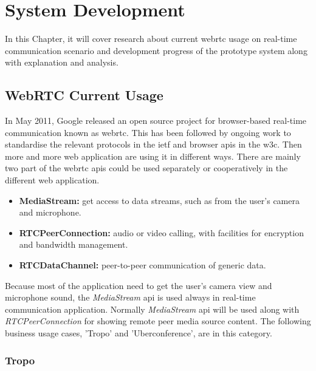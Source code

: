 \chapter{System Development}
\label{chp:sys_dev}

\noindent In this Chapter, it will cover research about current \gls{webrtc} usage on real-time communication scenario and development progress of the prototype system along with explanation and analysis.

\section{WebRTC Current Usage}

\noindent In May 2011, Google released an open source project for browser-based real-time communication known as \gls{webrtc}. This has been followed by ongoing work to standardise the relevant protocols in the \gls{ietf} and browser \gls{api}s in the \gls{w3c}. Then more and more web application are using it in different ways. There are mainly two part of the \gls{webrtc} \gls{api}s could be used separately or cooperatively in the different web application.

\begin{itemize}[topsep=-1em,parsep=0em,itemsep=0em]
 \item \textbf{MediaStream:} get access to data streams, such as from the user's camera and microphone.
 \item \textbf{RTCPeerConnection:} audio or video calling, with facilities for encryption and bandwidth management.
 \item \textbf{RTCDataChannel:} peer-to-peer communication of generic data.
\end{itemize}

\par Because most of the application need to get the user's camera view and microphone sound, the \textit{MediaStream} \gls{api} is used always in real-time communication application. Normally \textit{MediaStream} \gls{api} will be used along with \textit{RTCPeerConnection} for showing remote peer media source content. The following business usage cases, 'Tropo' and 'Uberconference', are in this category.

\clearpage

\subsection{Tropo}

